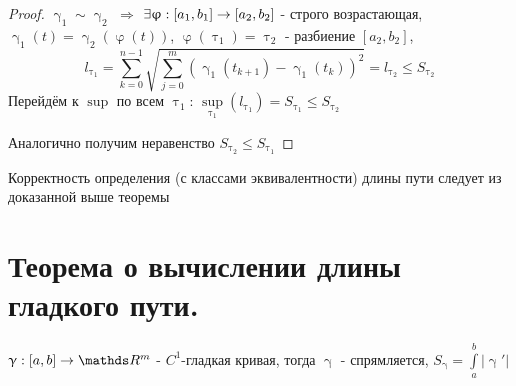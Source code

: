 \documentclass[11pt, fleqn]{article}
\begin{document}
\begin{Property}[3]
\begin{Property}[4]
\begin{Property}[2, аддитивность]
\begin{Proof}
\begin{proof}
    $\upgamma_1 \sim \upgamma_2$ $\Rightarrow$ $\exists \upvarphi: [a_1, b_1] \rightarrow [a_2, b_2]$ - строго возрастающая, $\upgamma_1(t) = \upgamma_2(\upvarphi(t))$, $\upvarphi(\uptau_1) = \uptau_2$ - разбиение $[a_2,b_2]$, 
    $$l_{\uptau_1} = \sum\limits_{k=0}^{n-1} \sqrt{\sum\limits_{j=0}^m (\upgamma_1(t_{k+1}) - \upgamma_1(t_k))^2} = l_{\uptau_2} \leqslant S_{\uptau_2}$$
    Перейдём к $\sup$ по всем $\uptau_1$: $\sup\limits_{\uptau_1} (l_{\uptau_1}) = S_{\uptau_1} \leqslant S_{\uptau_2}$
    
    Аналогично получим неравенство $S_{\uptau_2} \leqslant S_{\uptau_1}$ 
\end{proof}

\begin{remark}
    Корректность определения (с классами эквивалентности) длины пути следует из доказанной выше теоремы
\end{remark}

\newpage
\section{Теорема о вычислении длины гладкого пути.}
 
\begin{theorem}
    $\upgamma: [a,b] \rightarrow \R^m$ - $C^1$-гладкая кривая, тогда $\upgamma$ - спрямляется, $S_{\upgamma} = \int\limits_a^b |\upgamma'|$
\end{theorem}


\end{Proof}
\end{Property}
\end{Property}
\end{Property}
\end{document}
